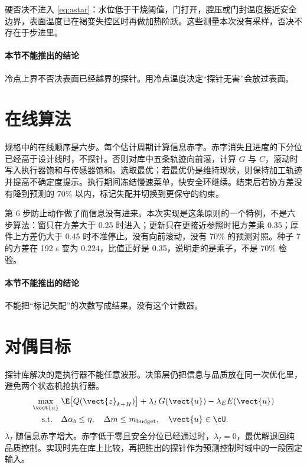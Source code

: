 硬否决不进入 \eqref{eq:astar}：水位低于干烧阈值，门打开，腔压或门封温度接近安全边界，表面温度已在褐变失控区时再做加热阶跃。这些测量本次没有采样，否决不存在于步进里。

\paragraph{本节不能推出的结论}
冷点上界不否决表面已经越界的探针。用冷点温度决定“探针无害”会放过表面。

\section{在线算法}

规格中的在线顺序是六步。每个估计周期计算信息赤字。赤字消失且进度的下分位已经高于设计线时，不探针。否则对库中五条轨迹向前滚，计算 \(G\) 与 \(C\)，滚动时写入执行器饱和与传感器饱和。选取最优；若最优仍是维持现状，则保持加工轨迹并提高不确定度提示。执行期间冻结慢速菜单，快安全环继续。结束后若协方差没有降到预测的 70\% 以内，标记失配并切换到更保守的约束。

第 6 步防止动作做了而信息没有进来。本次实现是这条原则的一个特例，不是六步算法：窗只在方差大于 0.25 时进入；更新只在更接近参照时把方差乘 0.35；厚件上方差仍大于 0.45 时不准停止。没有向前滚动，没有 70\% 的预测对照。种子 7 的方差在 192 s 变为 \(0.224\)，比值正好是 0.35，说明走的是乘子，不是 70\% 检验。

\paragraph{本节不能推出的结论}
不能把“标记失配”的次数写成结果。没有这个计数器。

\section{对偶目标}

探针库解决的是执行器不能任意波形。决策层仍把信息与品质放在同一次优化里，避免两个状态机抢执行器。
\begin{equation}
\label{eq:dual}
\begin{aligned}
\max_{\vect{u}}\;
& \E\big[Q(\vect{z}_{k+H})\big]
+\lambda_I\, G(\vect{u})
-\lambda_E E(\vect{u})\\
\mathrm{s.t.}\quad
& \Delta\alpha_b\le\eta,\quad
\Delta m\le m_{\mathrm{budget}},\quad
\vect{u}\in\cU.
\end{aligned}
\end{equation}
\(\lambda_I\) 随信息赤字增大。赤字低于零且安全分位已经通过时，\(\lambda_I=0\)，最优解退回纯品质控制。实现时先在库上比较，再把胜出的探针作为预测控制时域中的一段固定输入。

